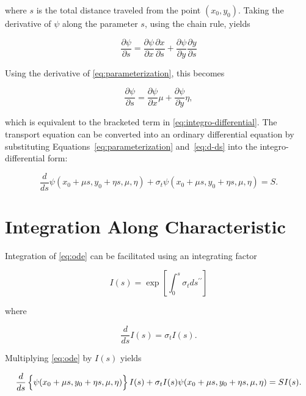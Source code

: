 \documentclass{midterm-template}
\begin{document}
where $s$ is the total distance traveled from the point $(x_0, y_0)$. Taking the derivative of $\psi$ along the parameter $s$, using the chain rule, yields

\begin{equation}
    \frac{\partial \psi}{\partial s} = \frac{\partial \psi}{\partial x} \frac{\partial x}{\partial s} + \frac{\partial \psi}{\partial y} \frac{\partial y}{\partial s}
\end{equation}

Using the derivative of \autoref{eq:parameterization}, this becomes

\begin{equation}\label{eq:d-ds}
    \frac{\partial \psi}{\partial s} = \frac{\partial \psi}{\partial x} \mu + \frac{\partial \psi}{\partial y} \eta,
\end{equation}

which is equivalent to the bracketed term in \autoref{eq:integro-differential}. The transport equation can be converted into an ordinary differential equation by substituting Equations~\ref{eq:parameterization} and~\ref{eq:d-ds} into the integro-differential form:

\begin{equation}\label{eq:ode}
    \frac{d}{ds}\psi(x_0 + \mu s, y_0 + \eta s, \mu, \eta) + \sigma_t \psi(x_0 + \mu s, y_0 + \eta s, \mu, \eta) = S.
\end{equation}

\section{Integration Along Characteristic}

Integration of \autoref{eq:ode} can be facilitated using an integrating factor

\begin{equation}\label{eq:integrating-factor}
    I(s) = \exp\left[ \int_0^{s} \sigma_t ds^{\prime \prime} \right]
\end{equation}

where

\begin{equation}\label{eq:dIds}
    \frac{d}{ds} I(s) = \sigma_t I(s).
\end{equation}

Multiplying \autoref{eq:ode} by $I(s)$ yields

\begin{equation}
    \frac{d}{ds} \left\{ \psi(x_0 + \mu s, y_0 + \eta s, \mu, \eta)  \vphantom{\frac{}{}} \right\}I(s) + \sigma_t I(s) \psi(x_0 + \mu s, y_0 + \eta s, \mu, \eta)  = S I(s).
\end{equation}
\end{document}
